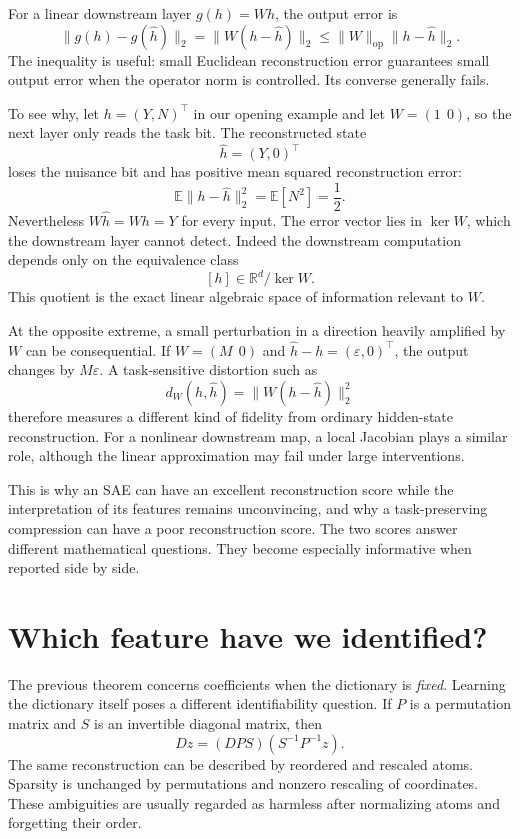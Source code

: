 For a linear downstream layer \(g(h)=Wh\), the output error is
\[
 \|g(h)-g(\widehat h)\|_2
 =\|W(h-\widehat h)\|_2
 \leq\|W\|_{\mathrm{op}}\|h-\widehat h\|_2.
\]
The inequality is useful: small Euclidean reconstruction error guarantees small output error when the operator norm is controlled. Its converse generally fails.

To see why, let \(h=(Y,N)^\top\) in our opening example and let \(W=(1\ \ 0)\), so the next layer only reads the task bit. The reconstructed state
\[
 \widehat h=(Y,0)^\top
\]
loses the nuisance bit and has positive mean squared reconstruction error:
\[
 \mathbb E\|h-\widehat h\|_2^2
 =\mathbb E[N^2]=\frac12.
\]
Nevertheless \(W\widehat h=Wh=Y\) for every input. The error vector lies in
\(\ker W\), which the downstream layer cannot detect. Indeed the downstream computation depends only on the equivalence class
\[
 [h]\in\mathbb R^d/\ker W.
\]
This quotient is the exact linear algebraic space of information relevant to \(W\).

At the opposite extreme, a small perturbation in a direction heavily amplified by \(W\) can be consequential. If \(W=(M\ \ 0)\) and
\(\widehat h-h=(\varepsilon,0)^\top\), the output changes by \(M\varepsilon\). A task-sensitive distortion such as
\[
 d_W(h,\widehat h)=\|W(h-\widehat h)\|_2^2
\]
therefore measures a different kind of fidelity from ordinary hidden-state reconstruction. For a nonlinear downstream map, a local Jacobian plays a similar role, although the linear approximation may fail under large interventions.

This is why an SAE can have an excellent reconstruction score while the interpretation of its features remains unconvincing, and why a task-preserving compression can have a poor reconstruction score. The two scores answer different mathematical questions. They become especially informative when reported side by side.

\section{Which feature have we identified?}

The previous theorem concerns coefficients when the dictionary is \emph{fixed}. Learning the dictionary itself poses a different identifiability question. If \(P\) is a permutation matrix and \(S\) is an invertible diagonal matrix, then
\[
 Dz=(DPS)(S^{-1}P^{-1}z).
\]
The same reconstruction can be described by reordered and rescaled atoms. Sparsity is unchanged by permutations and nonzero rescaling of coordinates. These ambiguities are usually regarded as harmless after normalizing atoms and forgetting their order.

